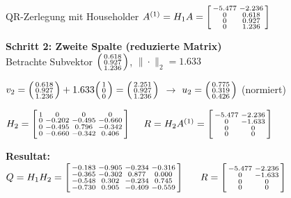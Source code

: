 \begin{example2}{QR-Zerlegung mit Householder}
$A^{(1)} = H_1 A = \begin{bsmallmatrix} -5.477 & -2.236 \\ 0 & 0.618 \\ 0 & 0.927 \\ 0 & 1.236 \end{bsmallmatrix}$

\textbf{Schritt 2: Zweite Spalte (reduzierte Matrix)}\\
Betrachte Subvektor $\begin{psmallmatrix} 0.618 \\ 0.927 \\ 1.236 \end{psmallmatrix}$, $\|\cdot\|_2 = 1.633$

$v_2 = \begin{psmallmatrix} 0.618 \\ 0.927 \\ 1.236 \end{psmallmatrix} + 1.633 \begin{psmallmatrix} 1 \\ 0 \\ 0 \end{psmallmatrix} = \begin{psmallmatrix} 2.251 \\ 0.927 \\ 1.236 \end{psmallmatrix}$
$\rightarrow$
$u_2 = \begin{psmallmatrix} 0.775 \\ 0.319 \\ 0.426 \end{psmallmatrix}$ (normiert)

$H_2 = \begin{bsmallmatrix} 1 & 0 & 0 & 0 \\ 0 & -0.202 & -0.495 & -0.660 \\ 0 & -0.495 & 0.796 & -0.342 \\ 0 & -0.660 & -0.342 & 0.406 \end{bsmallmatrix}$
$\quad R = H_2 A^{(1)} = \begin{bsmallmatrix} -5.477 & -2.236 \\ 0 & -1.633 \\ 0 & 0 \\ 0 & 0 \end{bsmallmatrix}$

\textbf{Resultat:}\\
$Q = H_1 H_2 = \begin{bsmallmatrix} -0.183 & -0.905 & -0.234 & -0.316 \\ -0.365 & -0.302 & 0.877 & 0.000 \\ -0.548 & 0.302 & -0.234 & 0.745 \\ -0.730 & 0.905 & -0.409 & -0.559 \end{bsmallmatrix}$
$\quad$
$R = \begin{bsmallmatrix} -5.477 & -2.236 \\ 0 & -1.633 \\ 0 & 0 \\ 0 & 0 \end{bsmallmatrix}$


\end{example2}
